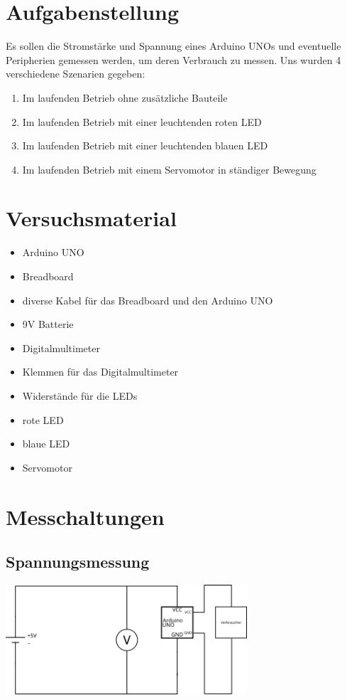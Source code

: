\documentclass[8pt, letterpaper]{article}
\title{}
\author{Jakob Kirsch und Finn Decker}
\date{\parbox{\linewidth}{\centering%
  \today\endgraf\bigskip
  Fach: IT\endgraf\medskip
  Betreür: Herr Kutzner\endgraf\medskip
}}
\begin{document}
\maketitle
\newpage

\section{Aufgabenstellung}
Es sollen die Stromstärke und Spannung eines Arduino UNOs und eventuelle Peripherien gemessen werden, um deren Verbrauch zu messen.
Uns wurden 4 verschiedene Szenarien gegeben:

\begin{enumerate}
  \item Im laufenden Betrieb ohne zusätzliche Bauteile
  \item Im laufenden Betrieb mit einer leuchtenden roten LED
  \item Im laufenden Betrieb mit einer leuchtenden blauen LED
  \item Im laufenden Betrieb mit einem Servomotor in ständiger Bewegung
\end{enumerate}

\section{Versuchsmaterial}
\begin{itemize}
  \item Arduino UNO
  \item Breadboard
  \item diverse Kabel für das Breadboard und den Arduino UNO
  \item 9V Batterie
  \item Digitalmultimeter
  \item Klemmen für das Digitalmultimeter
  \item Widerstände für die LEDs
  \item rote LED
  \item blaue LED
  \item Servomotor
\end{itemize}

\section{Messchaltungen}
\subsection{Spannungsmessung}
\includegraphics[width=9cm]{volt}
\end{document}
